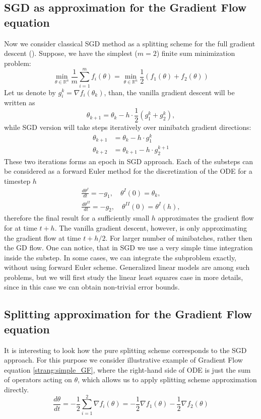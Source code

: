 \documentclass{article}
\begin{document}
\subsection{SGD as approximation for the Gradient Flow equation}
Now we consider classical SGD method as a splitting scheme for the full gradient descent (\cite{cauchy1847methode}). Suppose, we have the simplest ($m=2$) finite sum minimization problem:
$$
\min_{\theta \in \mathbb{R}^n} \frac{1}{m}\sum\limits_{i=1}^m f_i(\theta) = \min_{\theta \in \mathbb{R}^n} \frac{1}{2} \left( f_1(\theta) + f_2(\theta)\right)
$$
Let us denote by $g_i^k = \nabla f_i(\theta_k)$, than, the vanilla gradient descent will be written as
$$
\theta_{k+1} = \theta_k - h\cdot\frac{1}{2} \left( g^k_1 + g^k_2\right),
$$
while SGD version will take steps iteratively over minibatch gradient directions:
\begin{align*}\label{strang:sgd2}
\theta_{k+1} &= \theta_k - h\cdot g^k_1 \\
\theta_{k+2} &= \theta_{k+1} - h\cdot  g^{k+1}_2
\end{align*}
These two iterations forms an epoch in SGD approach. Each of the substeps can be considered as a forward Euler method for the discretization of the ODE for a timestep $h$
\begin{align*}
    \frac{d \theta^I}{d t} = -g_1, \quad \theta^I(0) = \theta_{k},\\
    \frac{d \theta^{II}}{d t} = -g_2, \quad \theta^{II}(0) = \theta^{I}(h),
\end{align*}
therefore the final result for a sufficiently small $h$ approximates the gradient flow for at time $t + h$. The vanilla gradient descent, however, is only approximating the gradient flow at time $t + h/2$. For larger number of minibatches, rather then the GD flow. One can notice, that in SGD we use a very simple time integration inside the substep. In some cases, we can integrate the subproblem exactly, without using forward Euler scheme. Generalized linear models are among such problems, but we will first study the linear least squares case in more details, since in this case we can obtain non-trivial error bounds.

\subsection{Splitting approximation for the Gradient Flow equation}

It is interesting to look how the pure splitting scheme corresponds to the SGD approach. For this purpose we consider illustrative example of Gradient Flow equation \ref{strang:simple_GF}, where the right-hand side of ODE is just the sum of operators acting on $\theta$, which allows us to apply splitting scheme approximation directly.
\begin{equation}
\label{strang:simple_GF}
\frac{d \theta}{d t} = -\frac{1}{2} \sum\limits_{i=1}^2 \nabla f_i (\theta) = - \frac{1}{2} \nabla f_1 (\theta) -\frac{1}{2}  \nabla f_2 (\theta)
\end{equation}
\end{document}
